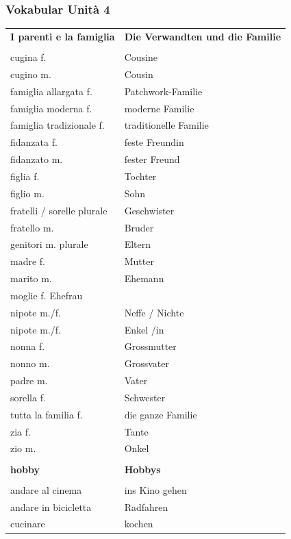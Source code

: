 \documentclass[10pt]{scrartcl}
\begin{document}
\begin{multicols*}{2}
\subsubsection*{Vokabular Unità 4}
\begin{supertabular}{p{4cm}p{4cm}}
\textbf{I parenti e la famiglia} & \textbf{Die Verwandten und die Familie}\\
\\
cugina \hfill f. & Cousine\\
cugino \hfill m. & Cousin\\
famiglia allargata \hfill f. & Patchwork-Familie\\
famiglia moderna \hfill f. & moderne Familie\\
famiglia tradizionale \hfill f. & traditionelle Familie\\
fidanzata \hfill f. & feste Freundin\\
fidanzato \hfill m. & fester Freund\\
figlia \hfill f. & Tochter\\
figlio \hfill m. & Sohn\\
fratelli / sorelle \hfill plurale & Geschwister\\
fratello \hfill m. & Bruder\\
genitori \hfill m. plurale & Eltern\\
madre \hfill f. & Mutter\\
marito \hfill m. & Ehemann\\
moglie \hfill f. Ehefrau\\
nipote \hfill m./f. & Neffe / Nichte\\
nipote \hfill m./f. & Enkel /in\\
nonna \hfill f. & Grossmutter\\
nonno \hfill m. & Grossvater\\
padre \hfill m. & Vater\\ 
sorella \hfill f. & Schwester\\
tutta la familia \hfill f. & die ganze Familie\\
zia \hfill f. & Tante\\
zio \hfill m. & Onkel\\
\\
\textbf{hobby} & \textbf{Hobbys}\\
\\
andare al cinema & ins Kino gehen\\
andare in bicicletta & Radfahren\\
cucinare & kochen\\

\end{supertabular}
\end{multicols*}
\end{document}
